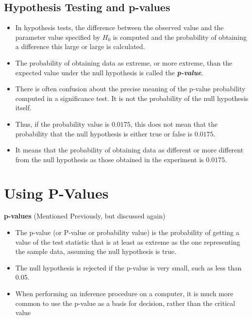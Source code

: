 \documentclass[]{report}
\begin{document}
	\subsection{Hypothesis Testing and p-values}
	\begin{itemize}
		\item In hypothesis tests, the difference between the observed value and the parameter value specified by $H_0$ is computed and the probability of obtaining a difference this large or large is calculated.
		\item The probability of obtaining data as extreme, or more extreme, than the expected value under the null hypothesis is called the \textbf{\emph{p-value}}.
		\item There is often confusion about the precise meaning of the p-value probability computed in a significance test. It is not the probability of the null hypothesis itself.
		\item Thus, if the probability value is $0.0175$, this does not mean that the probability that the null hypothesis is either true or false is $0.0175$.
		\item It means that the probability of obtaining data as different or more different from the null hypothesis as those obtained in the experiment is $0.0175$.
	\end{itemize}
	
	
	
	\section{Using P-Values}
	{
		\textbf{p-values}
		(Mentioned Previously, but discussed again)
		\begin{itemize}
			\item The p-value (or P-value or probability value) is the probability of getting a value of the test statistic that is at least as extreme as the one representing the sample data, assuming the null hypothesis is true.
			\item The null hypothesis is rejected if the p-value is very small, such as less than 0.05.
			\item When performing an inference procedure on a computer, it is much more common to use the p-value as a basis for decision, rather than the critical value
		\end{itemize}
	}
	
\end{document}
